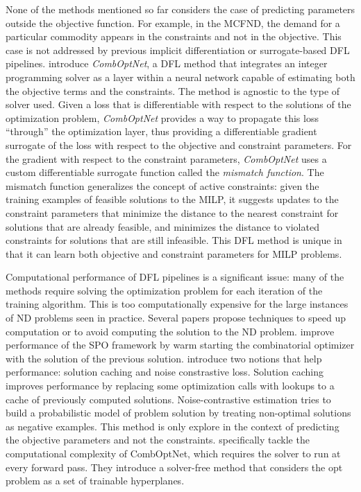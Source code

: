 None of the methods mentioned so far considers the case of predicting parameters outside the objective function. For example, in the MCFND, the demand for a particular commodity appears in the constraints and not in the objective. This case is not addressed by previous implicit differentiation or surrogate-based DFL pipelines. \cite{paulusCombOptNetFitRight2022} introduce \textit{CombOptNet}, a DFL method that integrates an integer programming solver as a layer within a neural network capable of estimating both the objective terms and the constraints. The method is agnostic to the type of solver used. Given a loss that is differentiable with respect to the solutions of the optimization problem, \textit{CombOptNet} provides a way to propagate this loss ``through'' the optimization layer, thus providing a differentiable gradient surrogate of the loss with respect to the objective and constraint parameters. For the gradient with respect to the constraint parameters, \textit{CombOptNet} uses a custom differentiable surrogate function called the \textit{mismatch function}. The mismatch function generalizes the concept of active constraints: given the training examples of feasible solutions to the MILP, it suggests updates to the constraint parameters that minimize the distance to the nearest constraint for solutions that are already feasible, and minimizes the distance to violated constraints for solutions that are still infeasible. This DFL method is unique in that it can learn both objective and constraint parameters for MILP problems. 

Computational performance of DFL pipelines is a significant issue: many of the methods require solving the optimization problem for each iteration of the training algorithm. This is too computationally expensive for the large instances of ND problems seen in practice. Several papers propose techniques to speed up computation or to avoid computing the solution to the ND problem. \cite{mandiSmartPredictandOptimizeHard2019} improve performance of the SPO framework by warm starting the combinatorial optimizer with the solution of the previous solution. \cite{mulambaContrastiveLossesSolution2021} introduce two notions that help performance: solution caching and noise constrastive loss. Solution caching improves performance by replacing some optimization calls with lookups to a cache of previously computed solutions. Noise-contrastive estimation tries to build a probabilistic model of problem solution by treating non-optimal solutions as negative examples. This method is only explore in the context of predicting the objective parameters and not the constraints. \cite{nandwaniSolverFreeFrameworkScalable2023} specifically tackle the computational complexity of CombOptNet, which requires the solver to run at every forward pass. They introduce a solver-free method that considers the opt problem as a set of trainable hyperplanes. 


